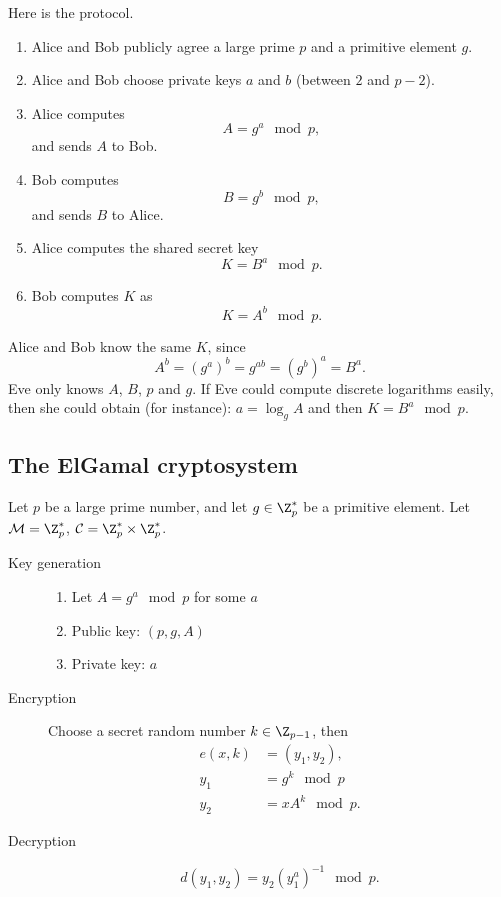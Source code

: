 \documentclass[a4paper, 11pt, openany]{book}
\begin{document}
Here is the protocol.
\begin{enumerate}
    \item Alice and Bob publicly agree a large prime $p$ and a primitive element $g$.

    \item Alice and Bob choose private keys $a$ and $b$ (between $2$ and $p-2$).

    \item Alice computes
    \[
        A = g^a \mod p,
    \]
    and sends $A$ to Bob.

    \item Bob computes
    \[
        B = g^b \mod p,
    \]
    and sends $B$ to Alice.

    \item Alice computes the shared secret key
    \[
        K = B^a \mod p.
    \]

    \item Bob computes $K$ as
    \[
        K = A^b \mod p.
    \]
\end{enumerate}


Alice and Bob know the same $K$, since
\[
    A^b = (g^a)^b = g^{ab} = (g^b)^a = B^a.
\]
Eve only knows $A$, $B$, $p$ and $g$. If Eve could compute discrete logarithms easily, then she could obtain (for instance): $a = \log_g A$ and then $K = B^a \mod p$.


\subsection{The ElGamal cryptosystem}


Let $p$ be a large prime number, and let $g \in \Z_p^*$ be a primitive element. Let $\mathcal{M} = \Z_p^*$, $\mathcal{C} = \Z_p^* \times \Z_p^*$.

\begin{description}
\item[Key generation]
    \begin{enumerate}
        \item Let $A = g^a \mod p$ for some $a$

        \item Public key: $(p, g, A)$

        \item Private key: $a$
    \end{enumerate}

\item[Encryption] Choose a secret random number $k \in \Z_{p-1}$, then
\begin{align*}
    e(x, k) &= (y_1, y_2),\\
    y_1 &= g^k \mod p\\
    y_2 &= x A^k \mod p.
\end{align*}


\item[Decryption]
\[
    d(y_1,y_2) = y_2 (y_1^a)^{-1} \mod p.
\]
\end{description}
\end{document}
